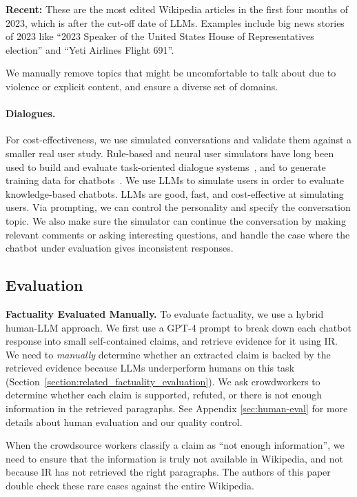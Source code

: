 {\bf Recent:} These are the most edited Wikipedia articles in the first four months of 2023, which is after the cut-off date of LLMs. Examples include big news stories of 2023 like “2023 Speaker of the United States House of Representatives election” and “Yeti Airlines Flight 691”. 

We manually remove topics that might be uncomfortable to talk about due to violence or explicit content, and ensure a diverse set of domains.

\paragraph{Dialogues.} 
For cost-effectiveness, we use simulated conversations and validate them against a smaller real user study. 
\label{sec:user_simulator}
Rule-based and neural user simulators have long been used to build and evaluate task-oriented dialogue systems~\cite{schatzmann-etal-2005-quantitative, zhu-etal-2020-convlab, wan-etal-2022-unified}, and to generate training data for chatbots~\cite{bao-etal-2023-synthetic, zheng-etal-2023-augesc}. We use LLMs to simulate users in order to evaluate knowledge-based chatbots. LLMs are good, fast, and cost-effective at simulating users.
Via prompting, we can control the personality and specify the conversation topic. We also make sure the simulator
can continue the conversation by making relevant comments or asking interesting questions, and handle the case where the chatbot under evaluation gives inconsistent responses.

\subsection{Evaluation}
{\bf Factuality Evaluated Manually.}
\label{sec:factual-evaluation}
To evaluate factuality, we use a hybrid human-LLM approach. We first use a GPT-4 prompt to break down each chatbot response into small self-contained claims, and retrieve evidence for it using IR. We need to {\em manually} determine whether an extracted claim is backed by the retrieved evidence because LLMs underperform humans on this task (Section~\ref{section:related_factuality_evaluation}). We ask crowdworkers to determine whether each claim is supported, refuted, or there is not enough information in the retrieved paragraphs. See Appendix \ref{sec:human-eval} for more details about human evaluation and our quality control.

When the crowdsource workers classify a claim as ``not enough information'', we need to ensure that the information is truly not available in Wikipedia, and not because IR has not retrieved the right paragraphs. The authors of this paper double check these rare cases against the entire Wikipedia.

